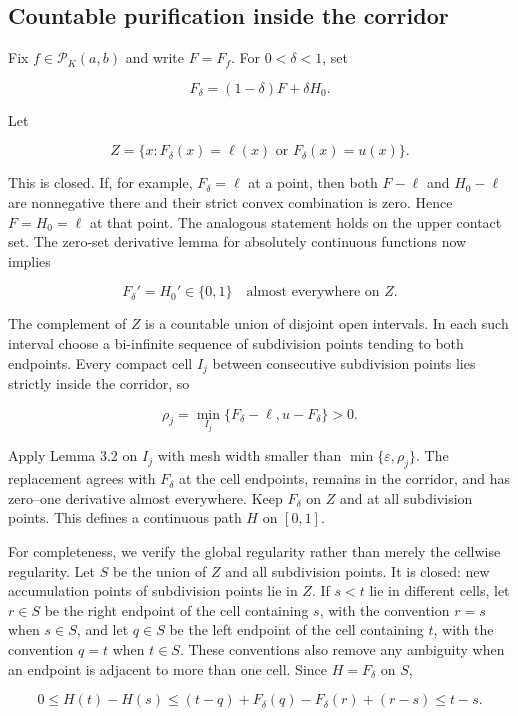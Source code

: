 \documentclass[11pt]{article}
\numberwithin{equation}{section}
\begin{document}
\subsection{Countable purification inside the corridor}


Fix $f\in\mathcal P_K(a,b)$ and write $F=F_f$. For $0<\delta<1$, set

\nopagebreak[4]
\[
F_\delta=(1-\delta)F+\delta H_0.
\]

Let

\nopagebreak[4]
\[
Z=\{x:F_\delta(x)=\ell(x)\text{ or }F_\delta(x)=u(x)\}.
\]

This is closed. If, for example, $F_\delta=\ell$ at a point, then both
$F-\ell$ and $H_0-\ell$ are nonnegative there and their strict convex combination is
zero. Hence $F=H_0=\ell$ at that point. The analogous statement holds on the upper
contact set. The zero-set derivative lemma for absolutely continuous functions now
implies

\nopagebreak[4]
\[
F_\delta'=H_0'\in\{0,1\}
\quad\text{almost everywhere on }Z.
\]

The complement of $Z$ is a countable union of disjoint open intervals. In each such
interval choose a bi-infinite sequence of subdivision points tending to both endpoints.
Every compact cell $I_j$ between consecutive subdivision points lies strictly inside
the corridor, so

\nopagebreak[4]
\[
\rho_j=\min_{I_j}\{F_\delta-\ell,u-F_\delta\}>0.
\]

Apply Lemma 3.2 on $I_j$ with mesh width smaller than
$\min\{\varepsilon,\rho_j\}$. The replacement agrees with $F_\delta$ at the cell
endpoints, remains in the corridor, and has zero--one derivative almost everywhere.
Keep $F_\delta$ on $Z$ and at all subdivision points. This defines a continuous path
$H$ on $[0,1]$.

For completeness, we verify the global regularity rather than merely the cellwise
regularity. Let $S$ be the union of $Z$ and all subdivision points. It is closed: new
accumulation points of subdivision points lie in $Z$. If $s<t$ lie in different cells,
let $r\in S$ be the right endpoint of the cell containing $s$, with the convention
$r=s$ when $s\in S$, and let $q\in S$ be the left endpoint of the cell containing $t$,
with the convention $q=t$ when $t\in S$. These conventions also remove any ambiguity
when an endpoint is adjacent to more than one cell. Since $H=F_\delta$ on $S$,

\nopagebreak[4]
\[
0\le H(t)-H(s)
\le (t-q)+F_\delta(q)-F_\delta(r)+(r-s)
\le t-s.
\]
\end{document}
